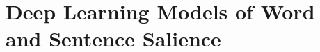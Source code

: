 
\section{Deep Learning Models of Word and Sentence Salience}

\label{sec:chapter4}

\def\tfidf{TF-IDF}

